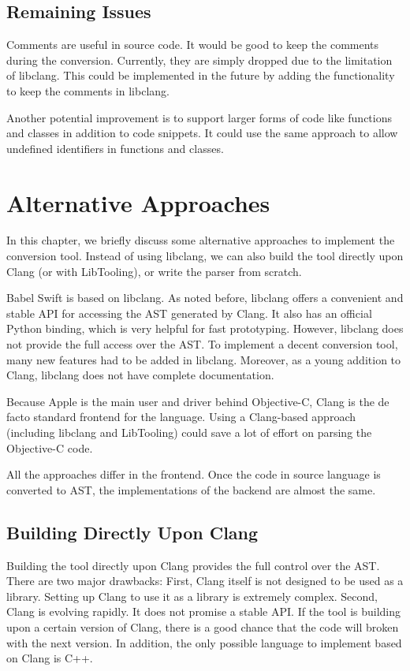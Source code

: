 \documentclass{sfuthesis}
\begin{document}
\section{Remaining Issues}


Comments are useful in source code. It would be good to keep the comments during the conversion. Currently, they are simply dropped due to the limitation of libclang. This could be implemented in the future by adding the functionality to keep the comments in libclang.

Another potential improvement is to support larger forms of code like functions and classes in addition to code snippets. It could use the same approach to allow undefined identifiers in functions and classes.

\chapter{Alternative Approaches}

In this chapter, we briefly discuss some alternative approaches to implement the conversion tool. Instead of using libclang, we can also build the tool directly upon Clang (or with LibTooling), or write the parser from scratch.

Babel Swift is based on libclang. As noted before, libclang offers a convenient and stable API for accessing the AST generated by Clang. It also has an official Python binding, which is very helpful for fast prototyping. However, libclang does not provide the full access over the AST. To implement a decent conversion tool, many new features had to be added in libclang. Moreover, as a young addition to Clang, libclang does not have complete documentation.

Because Apple is the main user and driver behind Objective-C, Clang is the de facto standard frontend for the language. Using a Clang-based approach (including libclang and LibTooling) could save a lot of effort on parsing the Objective-C code.

All the approaches differ in the frontend. Once the code in source language is converted to AST, the implementations of the backend are almost the same.

\section{Building Directly Upon Clang}

Building the tool directly upon Clang provides the full control over the AST. There are two major drawbacks: First, Clang itself is not designed to be used as a library. Setting up Clang to use it as a library is extremely complex. Second, Clang is evolving rapidly. It does not promise a stable API. If the tool is building upon a certain version of Clang, there is a good chance that the code will broken with the next version. In addition, the only possible language to implement based on Clang is C++.
\end{document}
